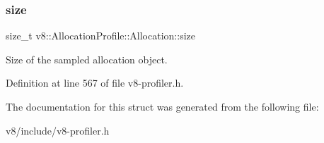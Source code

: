 \mbox{\label{structv8_1_1AllocationProfile_1_1Allocation_a346410fa5dfb796dff396069897c0aba}} 
\subsubsection{\texorpdfstring{size}{size}}
{\footnotesize\ttfamily size\+\_\+t v8\+::\+Allocation\+Profile\+::\+Allocation\+::size}

Size of the sampled allocation object. 

Definition at line 567 of file v8-\/profiler.\+h.



The documentation for this struct was generated from the following file\+:\begin{DoxyCompactItemize}
\item 
v8/include/v8-\/profiler.\+h\end{DoxyCompactItemize}
